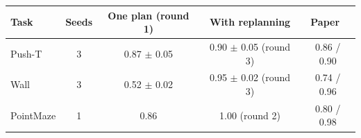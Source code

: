 \begin{tabular}{@{}lcccc@{}}
\toprule
Task & Seeds & One plan (round 1) & With replanning & Paper~\cite{ref1} \\
\midrule
Push-T & 3 & 0.87 $\pm$ 0.05 & 0.90 $\pm$ 0.05 (round 3) & 0.86 / 0.90 \\
Wall & 3 & 0.52 $\pm$ 0.02 & 0.95 $\pm$ 0.02 (round 3) & 0.74 / 0.96 \\
PointMaze & 1 & 0.86 & 1.00 (round 2) & 0.80 / 0.98 \\
\bottomrule
\end{tabular}
